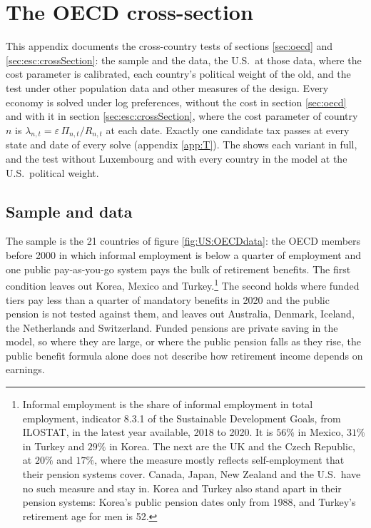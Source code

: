 \FloatBarrier
\section{The OECD cross-section}\label{app:oecd26}\setcounter{equation}{0}
This appendix documents the cross-country tests of sections \ref{sec:oecd} and \ref{sec:esc:crossSection}: the sample and the data, the U.S.\ at those data, where the cost parameter is calibrated, each country's political weight of the old, and the test under other population data and other measures of the design. Every economy is solved under log preferences, without the cost in section \ref{sec:oecd} and with it in section \ref{sec:esc:crossSection}, where the cost parameter of country $n$ is $\lambda_{n,t} = \varepsilon\,\Pi_{n,t}/R_{n,t}$ at each date. Exactly one candidate tax passes at every state and date of every solve (appendix \ref{app:T}). The  shows each variant in full, and the test without Luxembourg and with every country in the model at the U.S.\ political weight.

\subsection{Sample and data}\label{app:oecd26:data}
The sample is the 21 countries of figure \ref{fig:US:OECDdata}: the OECD members before 2000 in which informal employment is below a quarter of employment and one public pay-as-you-go system pays the bulk of retirement benefits. The first condition leaves out Korea, Mexico and Turkey.\footnote{Informal employment is the share of informal employment in total employment, indicator 8.3.1 of the Sustainable Development Goals, from ILOSTAT, in the latest year available, 2018 to 2020. It is $56\%$ in Mexico, $31\%$ in Turkey and $29\%$ in Korea. The next are the UK and the Czech Republic, at $20\%$ and $17\%$, where the measure mostly reflects self-employment that their pension systems cover. Canada, Japan, New Zealand and the U.S.\ have no such measure and stay in. Korea and Turkey also stand apart in their pension systems: Korea's public pension dates only from 1988, and Turkey's retirement age for men is 52.} The second holds where funded tiers pay less than a quarter of mandatory benefits in 2020 and the public pension is not tested against them, and leaves out Australia, Denmark, Iceland, the Netherlands and Switzerland. Funded pensions are private saving in the model, so where they are large, or where the public pension falls as they rise, the public benefit formula alone does not describe how retirement income depends on earnings.

